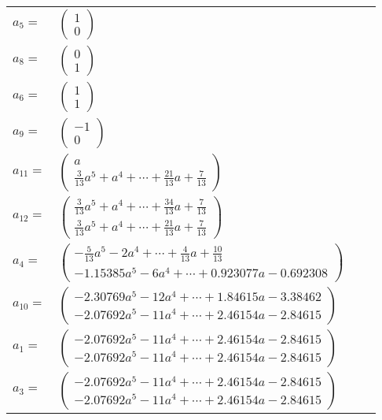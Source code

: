 \documentclass[1p]{elsarticle_modified}
\theoremstyle{definition}
\begin{document}
\begin{tabular}{m{7pt} m{180pt} m{7pt} m{180pt} }
\flushright $a_{5}=$&$\begin{pmatrix}1\\0\end{pmatrix}$ \\
\flushright $a_{8}=$&$\begin{pmatrix}0\\1\end{pmatrix}$ \\
\flushright $a_{6}=$&$\begin{pmatrix}1\\1\end{pmatrix}$ \\
\flushright $a_{9}=$&$\begin{pmatrix}-1\\0\end{pmatrix}$ \\
\flushright $a_{11}=$&$\begin{pmatrix}a\\\frac{3}{13} a^5+a^4+\cdots+\frac{21}{13} a+\frac{7}{13}\end{pmatrix}$ \\
\flushright $a_{12}=$&$\begin{pmatrix}\frac{3}{13} a^5+a^4+\cdots+\frac{34}{13} a+\frac{7}{13}\\\frac{3}{13} a^5+a^4+\cdots+\frac{21}{13} a+\frac{7}{13}\end{pmatrix}$ \\
\flushright $a_{4}=$&$\begin{pmatrix}-\frac{5}{13} a^5-2 a^4+\cdots+\frac{4}{13} a+\frac{10}{13}\\-1.15385 a^{5}-6 a^{4}+\cdots+0.923077 a-0.692308\end{pmatrix}$ \\
\flushright $a_{10}=$&$\begin{pmatrix}-2.30769 a^{5}-12 a^{4}+\cdots+1.84615 a-3.38462\\-2.07692 a^{5}-11 a^{4}+\cdots+2.46154 a-2.84615\end{pmatrix}$ \\
\flushright $a_{1}=$&$\begin{pmatrix}-2.07692 a^{5}-11 a^{4}+\cdots+2.46154 a-2.84615\\-2.07692 a^{5}-11 a^{4}+\cdots+2.46154 a-2.84615\end{pmatrix}$ \\
\flushright $a_{3}=$&$\begin{pmatrix}-2.07692 a^{5}-11 a^{4}+\cdots+2.46154 a-2.84615\\-2.07692 a^{5}-11 a^{4}+\cdots+2.46154 a-2.84615\end{pmatrix}$ \\

\end{tabular}
\end{document}
